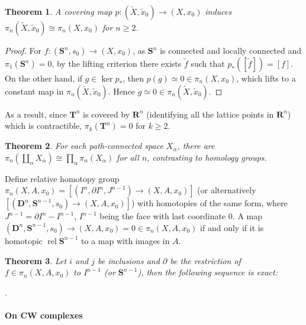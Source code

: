 \documentclass[11pt]{article}
\theoremstyle{definition}
\theoremstyle{plain}
\newtheorem{theorem}{Theorem}[section]
\newcommand{\R}{\mathbf{R}}
\DeclareMathOperator{\rel}{rel}
\newcommand{\1}{\mathbf{1}}
\newcommand{\s}{\mathbf{S}}
\begin{document}
\begin{theorem}
A covering map $p:(\widetilde{X},\widetilde{x}_0)\to(X,x_0)$ induces $\pi_n(\widetilde{X},\widetilde{x}_0)\cong\pi_n(X,x_0)$ for $n\geq2$.
\end{theorem}
\begin{proof}
For $f:(\s^n,s_0)\to(X,x_0)$, as $\s^n$ is connected and locally connected and $\pi_1(\s^n)=0$, by the lifting criterion there exists $\widetilde{f}$ such that $p_\ast([\widetilde{f}])=[f]$. On the other hand, if $g\in\ker p_\ast$, then $p(g)\simeq0\in\pi_n(X,x_0)$, which lifts to a constant map in $\pi_n(\widetilde{X},\widetilde{x}_0)$. Hence $g\simeq0\in\pi_n(\widetilde{X},\widetilde{x}_0)$.
\end{proof}

As a result, since $\mathbf{T}^n$ is covered by $\R^n$ (identifying all the lattice points in $\R^n$) which is contractible, $\pi_k(\mathbf{T}^n)=0$ for $k\geq2$.

\begin{theorem}
For each path-connected space $X_\alpha$, there are $\pi_n(\coprod_\alpha X_\alpha)\cong\prod_\alpha\pi_n(X_\alpha)$ for all $n$, contrasting to homology groups.
\end{theorem}

Define relative homotopy group $\pi_n(X,A,x_0)=[(I^n,\partial I^n,J^{n-1})\to(X,A,x_0)]$ (or alternatively $[(\mathbf{D}^n,\s^{n-1},s_0)\to(X,A,x_0)]$) with homotopies of the same form, where $J^{n-1}=\partial I^n-I^{n-1}$, $I^{n-1}$ being the face with last coordinate $0$. A map $(\mathbf{D}^n,\s^{n-1},s_0)\to(X,A,x_0)=0\in\pi_n(X,A,x_0)$ if and only if it is homotopic $\rel\s^{n-1}$ to a map with images in $A$.

\begin{theorem}
Let $i$ and $j$ be inclusions and $\partial$ be the restriction of $f\in\pi_n(X,A,x_0)$ to $I^{n-1}$ (or $\s^{n-1}$), then the following sequence is exact:
\begin{center}.\end{center}
\end{theorem}

\paragraph{On CW complexes}
\end{document}
